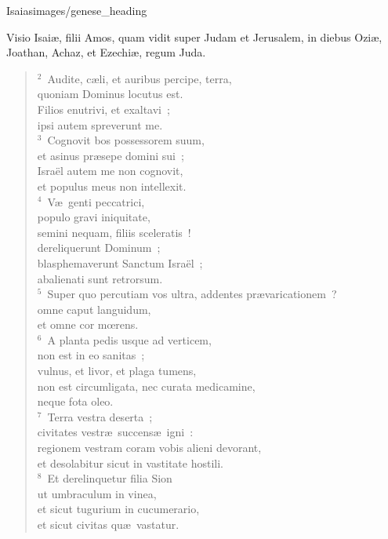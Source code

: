 {Isaias}{images/genese_heading}


\lettrine[lines=6,image=true,loversize=0.05,lraise=-0.03]{V}{}isio Isai\ae , filii Amos, quam vidit super Judam et Jerusalem, in diebus Ozi\ae , Joathan, Achaz, et Ezechi\ae , regum Juda.


\begin{flushleft}\begin{verse}\vspace{6pt}${}^{2}$~Audite, c\ae li, et auribus percipe, terra,\\ quoniam Dominus locutus est.\\ Filios enutrivi, et exaltavi~;\\ ipsi autem spreverunt me.\\
${}^{3}$~Cognovit bos possessorem suum,\\ et asinus pr\ae sepe domini sui~;\\ Isra\"el autem me non cognovit,\\ et populus meus non intellexit.\\
${}^{4}$~V\ae\ genti peccatrici,\\ populo gravi iniquitate,\\ semini nequam, filiis sceleratis~!\\ dereliquerunt Dominum~;\\ blasphemaverunt Sanctum Isra\"el~;\\ abalienati sunt retrorsum.\\
${}^{5}$~Super quo percutiam vos ultra, addentes pr\ae varicationem~?\\ omne caput languidum,\\ et omne cor mœrens.\\
${}^{6}$~A planta pedis usque ad verticem,\\ non est in eo sanitas~;\\ vulnus, et livor, et plaga tumens,\\ non est circumligata, nec curata medicamine,\\ neque fota oleo.\\
${}^{7}$~Terra vestra deserta~;\\ civitates vestr\ae\ succens\ae\ igni~:\\ regionem vestram coram vobis alieni devorant,\\ et desolabitur sicut in vastitate hostili.\\
${}^{8}$~Et derelinquetur filia Sion\\ ut umbraculum in vinea,\\ et sicut tugurium in cucumerario,\\ et sicut civitas qu\ae\ vastatur.\\

\end{verse}
\end{flushleft}
